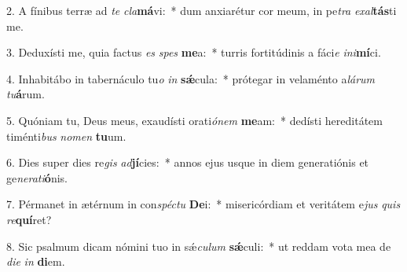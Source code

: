 2. A fínibus terræ ad \textit{te} \textit{cla}\textbf{má}vi:~*  dum anxiarétur cor meum, in pe\textit{tra} \textit{ex}\textit{al}\textbf{tás}ti me.\

3. Deduxísti me, quia factus \textit{es} \textit{spes} \textbf{me}a:~*  turris fortitúdinis a fáci\textit{e} \textit{in}\textit{i}\textbf{mí}ci.\

4. Inhabitábo in tabernáculo tu\textit{o} \textit{in} \textbf{sǽ}cula:~*  prótegar in velaménto a\textit{lá}\textit{rum} \textit{tu}\textbf{á}rum.\

5. Quóniam tu, Deus meus, exaudísti orati\textit{ó}\textit{nem} \textbf{me}am:~*  dedísti hereditátem timénti\textit{bus} \textit{no}\textit{men} \textbf{tu}um.\

6. Dies super dies re\textit{gis} \textit{ad}\textbf{jí}cies:~*  annos ejus usque in diem generatiónis et ge\textit{ne}\textit{ra}\textit{ti}\textbf{ó}nis.\

7. Pérmanet in ætérnum in con\textit{spéc}\textit{tu} \textbf{De}i:~*  misericórdiam et veritátem e\textit{jus} \textit{quis} \textit{re}\textbf{quí}ret?\

8. Sic psalmum dicam nómini tuo in sǽ\textit{cu}\textit{lum} \textbf{sǽ}culi:~*  ut reddam vota mea de \textit{di}\textit{e} \textit{in} \textbf{di}em.\

